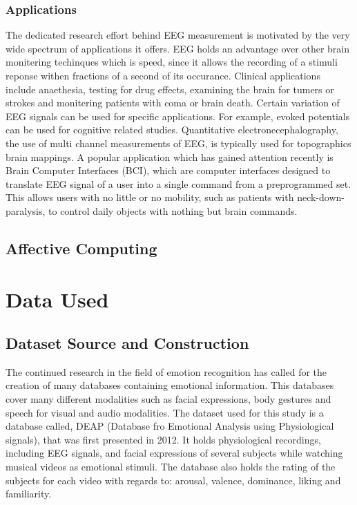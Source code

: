 \documentclass[12pt, a4paper, fleqn]{memoir}%
\begin{document}
\subsection{Applications}
The dedicated research effort behind EEG measurement is motivated by the very wide spectrum of applications it offers. EEG holds an advantage over other brain monitering techinques which is speed, since it allows the recording of a stimuli reponse withen fractions of a second of its occurance. Clinical applications include anaethesia, testing for drug effects, examining the brain for tumers or strokes and monitering patients with coma or brain death. Certain variation of EEG signals can be used for specific applications. For example, evoked potentials can be used for cognitive related studies. Quantitative electronecephalography, the use of multi channel measurements of EEG, is typically used for topographics brain mappings. A popular application which has gained attention recently is Brain Computer Interfaces (BCI), which are computer interfaces designed to translate EEG signal of a user into a single command from a preprogrammed set. This allows users with no little or no mobility, such as patients with neck-down-paralysis, to control daily objects with nothing but brain commands.

\section{Affective Computing}
\label{sec:Affective}


\chapter{Data Used}
\label{chap:dataset}

\section{Dataset Source and Construction}
\label{sec:DatasetSource}
The continued research in the field of emotion recognition has called for the creation of many databases containing emotional information. This databases cover many different modalities such as facial expressions, body gestures and speech for visual and audio modalities. The dataset used for this study is a database called, DEAP (Database fro Emotional Analysis using Physiological signals), that was first presented in 2012. It holds physiological recordings, including EEG signals, and facial expressions of several subjects while watching musical videos as emotional stimuli. The database also holds the rating of the subjects for each video with regards to: arousal, valence, dominance, liking and familiarity\cite{koelstra2012deap}.
\end{document}
